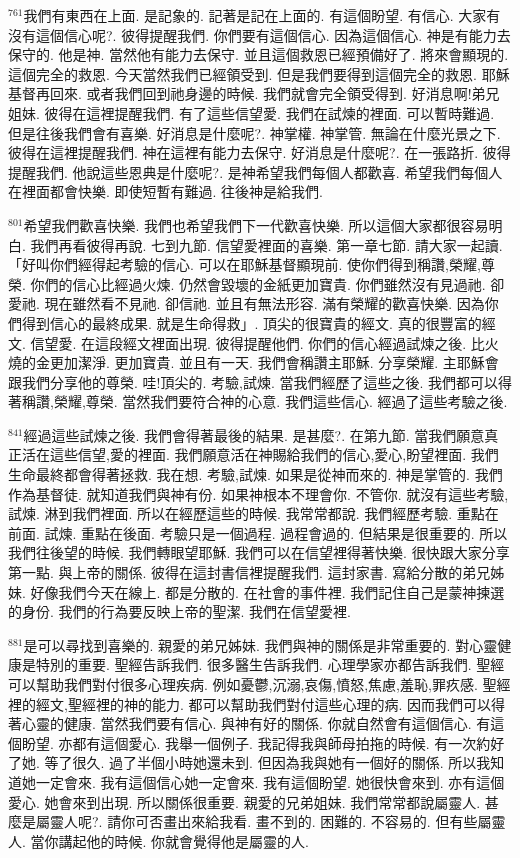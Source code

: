 \documentclass{book}
\begin{document}
$^{761}$我們有東西在上面.
是記象的.
記著是記在上面的.
有這個盼望.
有信心.
大家有沒有這個信心呢?.
彼得提醒我們.
你們要有這個信心.
因為這個信心.
神是有能力去保守的.
他是神.
當然他有能力去保守.
並且這個救恩已經預備好了.
將來會顯現的.
這個完全的救恩.
今天當然我們已經領受到.
但是我們要得到這個完全的救恩.
耶穌基督再回來.
或者我們回到祂身邊的時候.
我們就會完全領受得到.
好消息啊!弟兄姐妹.
彼得在這裡提醒我們.
有了這些信望愛.
我們在試煉的裡面.
可以暫時難過.
但是往後我們會有喜樂.
好消息是什麼呢?.
神掌權.
神掌管.
無論在什麼光景之下.
彼得在這裡提醒我們.
神在這裡有能力去保守.
好消息是什麼呢?.
在一張路折.
彼得提醒我們.
他說這些恩典是什麼呢?.
是神希望我們每個人都歡喜.
希望我們每個人在裡面都會快樂.
即使短暫有難過.
往後神是給我們.

$^{801}$希望我們歡喜快樂.
我們也希望我們下一代歡喜快樂.
所以這個大家都很容易明白.
我們再看彼得再說.
七到九節.
信望愛裡面的喜樂.
第一章七節.
請大家一起讀.
「好叫你們經得起考驗的信心.
可以在耶穌基督顯現前.
使你們得到稱讚,榮耀,尊榮.
你們的信心比經過火煉.
仍然會毀壞的金紙更加寶貴.
你們雖然沒有見過祂.
卻愛祂.
現在雖然看不見祂.
卻信祂.
並且有無法形容.
滿有榮耀的歡喜快樂.
因為你們得到信心的最終成果.
就是生命得救」.
頂尖的很寶貴的經文.
真的很豐富的經文.
信望愛.
在這段經文裡面出現.
彼得提醒他們.
你們的信心經過試煉之後.
比火燒的金更加潔淨.
更加寶貴.
並且有一天.
我們會稱讚主耶穌.
分享榮耀.
主耶穌會跟我們分享他的尊榮.
哇!頂尖的.
考驗,試煉.
當我們經歷了這些之後.
我們都可以得著稱讚,榮耀,尊榮.
當然我們要符合神的心意.
我們這些信心.
經過了這些考驗之後.

$^{841}$經過這些試煉之後.
我們會得著最後的結果.
是甚麼?.
在第九節.
當我們願意真正活在這些信望,愛的裡面.
我們願意活在神賜給我們的信心,愛心,盼望裡面.
我們生命最終都會得著拯救.
我在想.
考驗,試煉.
如果是從神而來的.
神是掌管的.
我們作為基督徒.
就知道我們與神有份.
如果神根本不理會你.
不管你.
就沒有這些考驗,試煉.
淋到我們裡面.
所以在經歷這些的時候.
我常常都說.
我們經歷考驗.
重點在前面.
試煉.
重點在後面.
考驗只是一個過程.
過程會過的.
但結果是很重要的.
所以我們往後望的時候.
我們轉眼望耶穌.
我們可以在信望裡得著快樂.
很快跟大家分享第一點.
與上帝的關係.
彼得在這封書信裡提醒我們.
這封家書.
寫給分散的弟兄姊妹.
好像我們今天在線上.
都是分散的.
在社會的事件裡.
我們記住自己是蒙神揀選的身份.
我們的行為要反映上帝的聖潔.
我們在信望愛裡.

$^{881}$是可以尋找到喜樂的.
親愛的弟兄姊妹.
我們與神的關係是非常重要的.
對心靈健康是特別的重要.
聖經告訴我們.
很多醫生告訴我們.
心理學家亦都告訴我們.
聖經可以幫助我們對付很多心理疾病.
例如憂鬱,沉溺,哀傷,憤怒,焦慮,羞恥,罪疚感.
聖經裡的經文,聖經裡的神的能力.
都可以幫助我們對付這些心理的病.
因而我們可以得著心靈的健康.
當然我們要有信心.
與神有好的關係.
你就自然會有這個信心.
有這個盼望.
亦都有這個愛心.
我舉一個例子.
我記得我與師母拍拖的時候.
有一次約好了她.
等了很久.
過了半個小時她還未到.
但因為我與她有一個好的關係.
所以我知道她一定會來.
我有這個信心她一定會來.
我有這個盼望.
她很快會來到.
亦有這個愛心.
她會來到出現.
所以關係很重要.
親愛的兄弟姐妹.
我們常常都說屬靈人.
甚麼是屬靈人呢?.
請你可否畫出來給我看.
畫不到的.
困難的.
不容易的.
但有些屬靈人.
當你講起他的時候.
你就會覺得他是屬靈的人.
\end{document}
